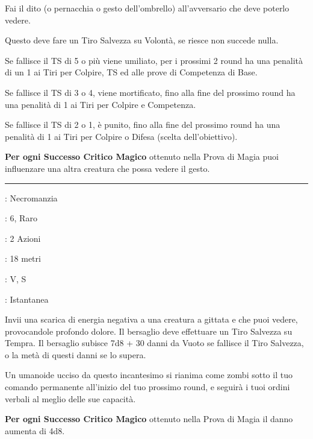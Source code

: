 \begin{multicols}{2}
Fai il dito (o pernacchia o gesto dell'ombrello) all'avversario che deve poterlo vedere.

Questo deve fare un Tiro Salvezza su Volontà, se riesce non succede nulla.

Se fallisce il TS di 5 o più viene umiliato, per i prossimi 2 round ha una penalità di un 1 ai Tiri per Colpire, TS ed alle prove di Competenza di Base.

Se fallisce il TS di 3 o 4, viene mortificato, fino alla fine del prossimo round ha una penalità di 1 ai Tiri per Colpire e Competenza.

Se fallisce il TS di 2 o 1, è punito, fino alla fine del prossimo round ha una penalità di 1 ai Tiri per Colpire o Difesa (scelta dell'obiettivo).

\textbf{Per ogni Successo Critico Magico} ottenuto nella Prova di Magia puoi influenzare una altra creatura che possa vedere il gesto.

\smallskip\noindent\rule{\linewidth}{2pt} \hypertarget{Dito della Morte}{}\smallskip{}
\noindent
\begin{description}[noitemsep, topsep=0pt, parsep=0pt, partopsep=0pt, leftmargin=0cm, labelwidth=2.8cm]
	\item[\textbf{Lista di Magia}]: Necromanzia
	\item[\textbf{Livello}]: 6, Raro
	\item[\textbf{T. di Lancio}]: 2 Azioni
	\item[\textbf{Gittata}]: 18 metri
	\item[\textbf{Componenti}]: V, S
	\item[\textbf{Durata}]: Istantanea
\end{description}

Invii una scarica di energia negativa a una creatura a gittata e che puoi vedere, provocandole profondo dolore. Il bersaglio deve effettuare un Tiro Salvezza su Tempra. Il bersaglio subisce 7d8 + 30 danni da Vuoto se fallisce il Tiro Salvezza, o la metà di questi danni se lo supera.

Un umanoide ucciso da questo incantesimo si rianima come zombi sotto il tuo comando permanente all'inizio del tuo prossimo round, e seguirà i tuoi ordini verbali al meglio delle sue capacità.

\textbf{Per ogni Successo Critico Magico} ottenuto nella Prova di Magia il danno aumenta di 4d8.


\end{multicols}
